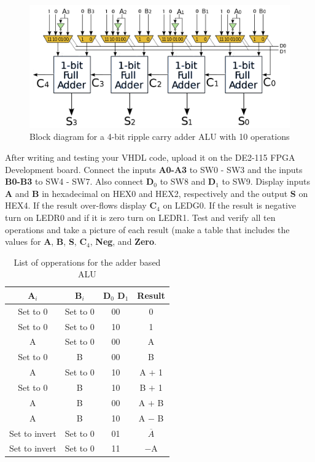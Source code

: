 \begin{figure}[H]
	\centering
	\includegraphics[width=150mm]{Lab3/figures/fulladderalu.png}
	\caption{Block diagram for a 4-bit ripple carry adder ALU with 10 operations}
	\label{fig:fulladderalu}
\end{figure}

After writing and testing your VHDL code, upload it on the DE2-115 FPGA Development board. Connect the inputs {\bf A0-A3} to SW0 - SW3 and the inputs {\bf B0-B3} to SW4 - SW7. Also connect {\bf D$_0$} to SW8 and {\bf D$_1$} to SW9. Display inputs {\bf A} and {\bf B} in hexadecimal on HEX0 and HEX2, respectively and the output {\bf S} on HEX4. If the result over-flows display {\bf C$_4$} on LEDG0. If the result is negative turn on LEDR0 and if it is zero turn on LEDR1. Test and verify all ten operations and take a picture of each result (make a table that includes the values for {\bf A}, {\bf B}, {\bf S}, {\bf C$_4$}, {\bf Neg}, and {\bf Zero}.

\begin{table}[H]
	\centering
	\caption{List of opperations for the adder based ALU}
	\begin{tabular}{ | c | c | c | c | }
		\hline                        
 		\bf A$_i$ & \bf B$_i$ & \bf D$_0$ D$_1$ & \bf Result \\ \hline
 		Set to 0 & Set to 0 & 00 & 0 \\ \hline
 		Set to 0 &  Set to 0 &10 & 1 \\ \hline
 		A &  Set to 0 & 00 & A \\ \hline
 		Set to 0& B  & 00  & B  \\ \hline
 		A & Set to 0 & 10 & A $+$ 1 \\ \hline
 		Set to 0 & B & 10 & B $+$ 1 \\ \hline
 		A & B & 00 & A $+$ B \\ \hline
 		A & B & 10 & A $-$ B \\ \hline
 		Set to invert & Set to 0 & 01 & $\overline{A}$ \\ \hline
 		Set to invert & Set to 0 & 11 & $-$A \\ 
 		\hline
	\end{tabular}
	\label{tab:adderaluop}
\end{table}

